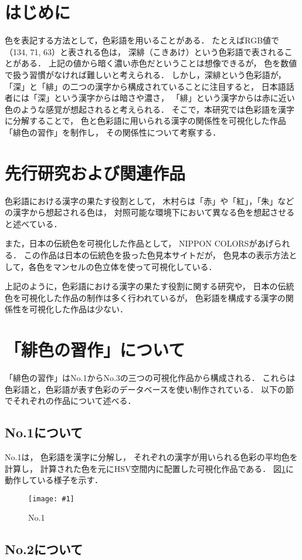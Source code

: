 \documentclass[a4j,twocolumn]{ujarticle} %
\newcommand{\workname}{緋色の習作}
\newcommand{\colorname}{色彩語}
\newcommand{\mysection}[1]{\vspace{-20pt}\section{#1}}
\newcommand{\mysubsection}[1]{\vspace{-18pt}\subsection{#1}}
\newcommand{\myfigure}[3]{
\begin{figure}[htbp]
  \begin{center}
    \texttt{[image: \#1]}
    \caption{#2}
    \vspace{-2zh}
    \label{#3}
  \end{center}
\end{figure}
}
\begin{document}
\maketitle
\thispagestyle{myheadings}

\mysection{はじめに}

色を表記する方法として，\colorname{}を用いることがある．
たとえばRGB値で（134, 71, 63）と表される色は，
深緋（こきあけ）という\colorname{}で表されることがある．
上記の値から暗く濃い赤色だということは想像できるが，
色を数値で扱う習慣がなければ難しいと考えられる．
しかし，深緋という\colorname{}が，
「深」と「緋」の二つの漢字から構成されていることに注目すると，
日本語話者には「深」という漢字からは暗さや濃さ，
「緋」という漢字からは赤に近い色のような感覚が想起されると考えられる．
そこで，本研究では\colorname{}を漢字に分解することで，
色と\colorname{}に用いられる漢字の関係性を可視化した作品「\workname{}」を制作し，
その関係性について考察する．

\mysection{先行研究および関連作品}

色彩語における漢字の果たす役割として，
木村ら\cite{Kimura1998}は「赤」や「紅」，「朱」などの漢字から想起される色は，
対照可能な環境下において異なる色を想起させると述べている．

また，日本の伝統色を可視化した作品として，
NIPPON COLORS\cite{NipponColors}があげられる．
この作品は日本の伝統色を扱った色見本サイトだが，
色見本の表示方法として，各色をマンセルの色立体を使って可視化している．

上記のように，色彩語における漢字の果たす役割に関する研究や，
日本の伝統色を可視化した作品の制作は多く行われているが，
色彩語を構成する漢字の関係性を可視化した作品は少ない．

\section{「\workname{}」について}

「\workname{}」はNo.1からNo.3の三つの可視化作品から構成される．
これらは\colorname{}と，色彩語が表す色彩のデータベースを使い制作されている．
以下の節でそれぞれの作品について述べる．

\mysubsection{No.1について}

No.1は，
\colorname{}を漢字に分解し，
それぞれの漢字が用いられる色彩の平均色を計算し，
計算された色を元にHSV空間内に配置した可視化作品である．
図\ref{no1}に動作している様子を示す．

\myfigure{fig/kanji-color-space.eps}{No.1}{no1}

\mysubsection{No.2について}
\end{document}
